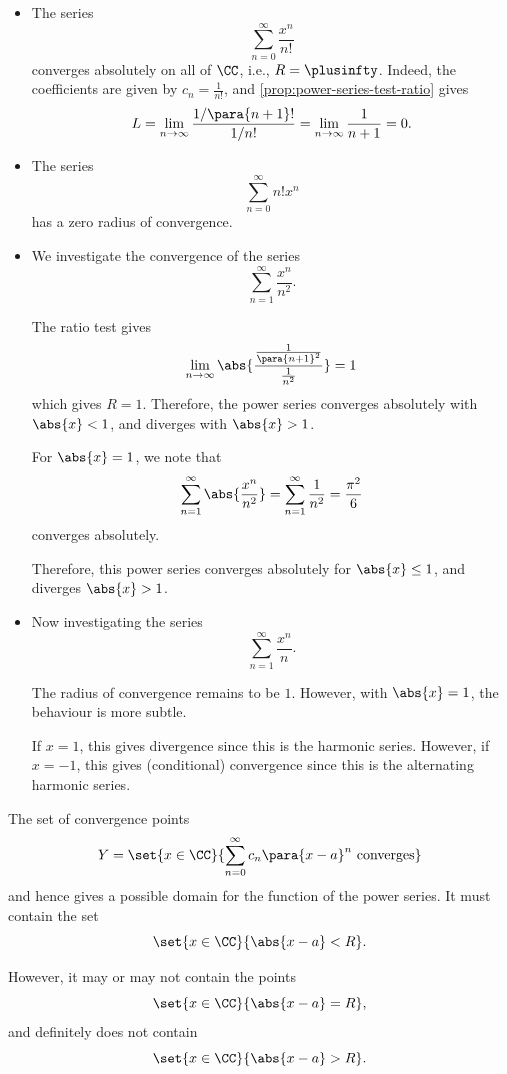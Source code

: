 \begin{examples}
    \label{ex:radius-of-convergence}%
    \begin{itemize}
        \item The series
        \[
            \sum_{n = 0}^{\infty} \frac{x^n}{n!}
        \]
        converges absolutely on all of \(\CC\), i.e., \(R = \plusinfty\). Indeed, the coefficients are given by \(c_n = \frac{1}{n!}\), and \autoref{prop:power-series-test-ratio} gives
        \[
            L = \lim_{n \to \infty} \frac{1 / \para{n + 1}!}{1 / n!} = \lim_{n \to \infty} \frac{1}{n + 1} = 0.
        \]
        
        \item The series
        \[
            \sum_{n = 0}^{\infty} n! x^n
        \]
        has a zero radius of convergence.

        \item We investigate the convergence of the series
        \[
            \sum_{n = 1}^{\infty} \frac{x^n}{n^2}.
        \]

        The ratio test gives
        \[
            \lim_{n \to \infty} \abs{\frac{\frac{1}{\para{n + 1}^2}}{\frac{1}{n^2}}} = 1
        \]
        which gives \(R = 1\). Therefore, the power series converges absolutely with \(\abs{x} < 1\), and diverges with \(\abs{x} > 1\).

        For \(\abs{x} = 1\), we note that
        \[
            \sum_{n = 1}^{\infty} \abs{\frac{x^n}{n^2}} = \sum_{n = 1}^{\infty} \frac{1}{n^2} = \frac{\pi^2}{6}
        \]
        converges absolutely.

        Therefore, this power series converges absolutely for \(\abs{x} \leq 1\), and diverges \(\abs{x} > 1\).

        \item Now investigating the series
        \[
            \sum_{n = 1}^{\infty} \frac{x^n}{n}.
        \]

        The radius of convergence remains to be \(1\). However, with \(\abs{x} = 1\), the behaviour is more subtle.

        If \(x = 1\), this gives divergence since this is the harmonic series. However, if \(x = -1\), this gives (conditional) convergence since this is the alternating harmonic series.
    \end{itemize}
\end{examples}

\begin{remark}
    The set of convergence points
    \[
        Y = \set{x \in \CC}{\sum_{n = 0}^{\infty} c_n \para{x - a}^n \text{ converges}}
    \]
    and hence gives a possible domain for the function of the power series. It must contain the set
    \[
        \set{x \in \CC}{\abs{x - a} < R}.
    \]

    However, it may or may not contain the points
    \[
        \set{x \in \CC}{\abs{x - a} = R},
    \]
    and definitely does not contain
    \[
        \set{x \in \CC}{\abs{x - a} > R}.
    \]
\end{remark}

